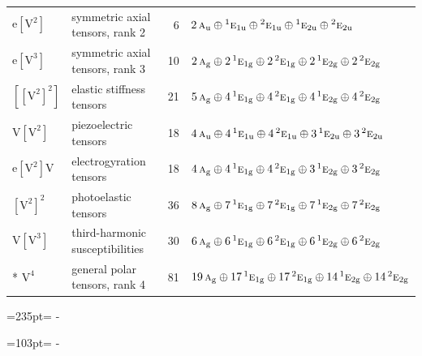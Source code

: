\documentclass[10pt,a4paper]{article}
\newcommand{\needspace}[1]{\par\penalty-100\begingroup\dimen0=#1\relax\dimen2=\pagegoal
  \advance\dimen2-\pagetotal\ifdim\dimen0>\dimen2\relax\ifdim\dimen2>0pt\vfil\break\fi\fi
  \endgroup}
\numberwithin{equation}{section}
\newcommand{\irr}[1]{\text{\normalfont\scshape #1}}
\newcommand{\conjpair}[1]{{}^{#1}}
\newcommand{\ptag}[1]{\mathrm{#1}}
\newcommand{\jahn}[1]{\mathrm{#1}}
\newlength{\fillwidth}\newlength{\cellwidth}\newlength{\colwidth}
\begin{document}
{\begin{longtable}{@{}llr>{\RaggedRight\arraybackslash}p{\fillwidth}@{}}
$\jahn{e[V^{2}]}$ & symmetric axial tensors, rank 2 & 6 & $2\,\irr{a}_{\ptag{u}} \oplus\allowbreak \conjpair{1}\irr{e}_{1\ptag{u}} \oplus\allowbreak \conjpair{2}\irr{e}_{1\ptag{u}} \oplus\allowbreak \conjpair{1}\irr{e}_{2\ptag{u}} \oplus\allowbreak \conjpair{2}\irr{e}_{2\ptag{u}}$\\
$\jahn{e[V^{3}]}$ & symmetric axial tensors, rank 3 & 10 & $2\,\irr{a}_{\ptag{g}} \oplus\allowbreak 2\,\conjpair{1}\irr{e}_{1\ptag{g}} \oplus\allowbreak 2\,\conjpair{2}\irr{e}_{1\ptag{g}} \oplus\allowbreak 2\,\conjpair{1}\irr{e}_{2\ptag{g}} \oplus\allowbreak 2\,\conjpair{2}\irr{e}_{2\ptag{g}}$\\
$\jahn{[[V^{2}]^{2}]}$ & elastic stiffness tensors & 21 & $5\,\irr{a}_{\ptag{g}} \oplus\allowbreak 4\,\conjpair{1}\irr{e}_{1\ptag{g}} \oplus\allowbreak 4\,\conjpair{2}\irr{e}_{1\ptag{g}} \oplus\allowbreak 4\,\conjpair{1}\irr{e}_{2\ptag{g}} \oplus\allowbreak 4\,\conjpair{2}\irr{e}_{2\ptag{g}}$\\
$\jahn{V[V^{2}]}$ & piezoelectric tensors & 18 & $4\,\irr{a}_{\ptag{u}} \oplus\allowbreak 4\,\conjpair{1}\irr{e}_{1\ptag{u}} \oplus\allowbreak 4\,\conjpair{2}\irr{e}_{1\ptag{u}} \oplus\allowbreak 3\,\conjpair{1}\irr{e}_{2\ptag{u}} \oplus\allowbreak 3\,\conjpair{2}\irr{e}_{2\ptag{u}}$\\
$\jahn{e[V^{2}]V}$ & electrogyration tensors & 18 & $4\,\irr{a}_{\ptag{g}} \oplus\allowbreak 4\,\conjpair{1}\irr{e}_{1\ptag{g}} \oplus\allowbreak 4\,\conjpair{2}\irr{e}_{1\ptag{g}} \oplus\allowbreak 3\,\conjpair{1}\irr{e}_{2\ptag{g}} \oplus\allowbreak 3\,\conjpair{2}\irr{e}_{2\ptag{g}}$\\
$\jahn{[V^{2}]^{2}}$ & photoelastic tensors & 36 & $8\,\irr{a}_{\ptag{g}} \oplus\allowbreak 7\,\conjpair{1}\irr{e}_{1\ptag{g}} \oplus\allowbreak 7\,\conjpair{2}\irr{e}_{1\ptag{g}} \oplus\allowbreak 7\,\conjpair{1}\irr{e}_{2\ptag{g}} \oplus\allowbreak 7\,\conjpair{2}\irr{e}_{2\ptag{g}}$\\
$\jahn{V[V^{3}]}$ & third-harmonic susceptibilities & 30 & $6\,\irr{a}_{\ptag{g}} \oplus\allowbreak 6\,\conjpair{1}\irr{e}_{1\ptag{g}} \oplus\allowbreak 6\,\conjpair{2}\irr{e}_{1\ptag{g}} \oplus\allowbreak 6\,\conjpair{1}\irr{e}_{2\ptag{g}} \oplus\allowbreak 6\,\conjpair{2}\irr{e}_{2\ptag{g}}$\\*
$\jahn{V^{4}}$ & general polar tensors, rank 4 & 81 & $19\,\irr{a}_{\ptag{g}} \oplus\allowbreak 17\,\conjpair{1}\irr{e}_{1\ptag{g}} \oplus\allowbreak 17\,\conjpair{2}\irr{e}_{1\ptag{g}} \oplus\allowbreak 14\,\conjpair{1}\irr{e}_{2\ptag{g}} \oplus\allowbreak 14\,\conjpair{2}\irr{e}_{2\ptag{g}}$\\
\bottomrule\end{longtable}}
\needspace{235pt}
\needspace{103pt}
\end{document}
